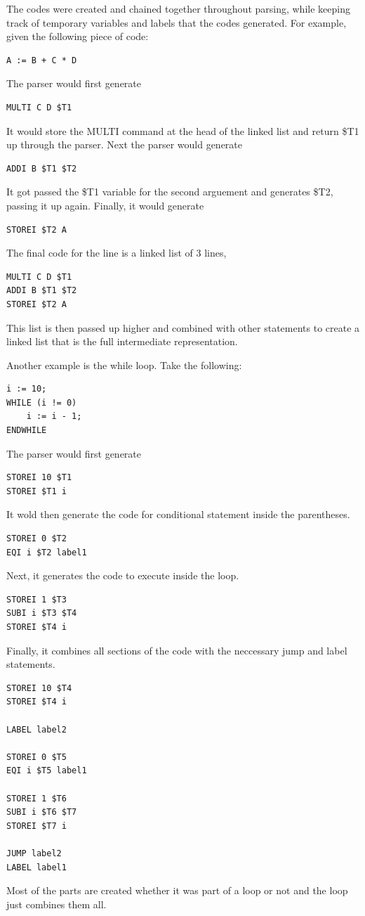 \documentclass[12pt]{article}
\begin{document}
            The codes were created and chained together throughout parsing, while keeping track of temporary variables and labels that the codes generated.
            For example, given the following piece of code:
            \begin{verbatim}
A := B + C * D
            \end{verbatim}
            The parser would first generate
            \begin{verbatim}
MULTI C D $T1
            \end{verbatim}
            It would store the MULTI command at the head of the linked list and return \$T1 up through the parser.
            Next the parser would generate
            \begin{verbatim}
ADDI B $T1 $T2
            \end{verbatim}
            It got passed the \$T1 variable for the second arguement and generates \$T2, passing it up again.
            Finally, it would generate
            \begin{verbatim}
STOREI $T2 A
            \end{verbatim}
            The final code for the line is a linked list of 3 lines,
            \begin{verbatim}
MULTI C D $T1
ADDI B $T1 $T2
STOREI $T2 A
            \end{verbatim}
            This list is then passed up higher and combined with other statements to create a linked list that is the full intermediate representation.

            Another example is the while loop.
            Take the following:
            \begin{verbatim}
i := 10;
WHILE (i != 0)
    i := i - 1;
ENDWHILE
            \end{verbatim}
            The parser would first generate
            \begin{verbatim}
STOREI 10 $T1
STOREI $T1 i
            \end{verbatim}
            It wold then generate the code for conditional statement inside the parentheses.
            \begin{verbatim}
STOREI 0 $T2
EQI i $T2 label1
            \end{verbatim}
            Next, it generates the code to execute inside the loop.
            \begin{verbatim}
STOREI 1 $T3
SUBI i $T3 $T4
STOREI $T4 i
            \end{verbatim}
            Finally, it combines all sections of the code with the neccessary jump and label statements.
            \begin{verbatim}
STOREI 10 $T4
STOREI $T4 i

LABEL label2 

STOREI 0 $T5
EQI i $T5 label1

STOREI 1 $T6
SUBI i $T6 $T7
STOREI $T7 i

JUMP label2 
LABEL label1
            \end{verbatim}
            Most of the parts are created whether it was part of a loop or not and the loop just combines them all.
\end{document}
